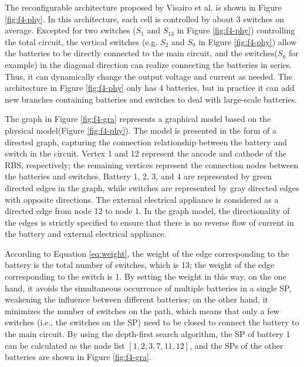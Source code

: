 \documentclass{article}
\begin{document}
The reconfigurable architecture proposed by Visairo et al.\cite{visairoReconfigurableBatteryPack2008} is shown in Figure \ref{fig:f4-phy}.
In this architecture, each cell is controlled by about 3 switches on average.
Excepted for two switches ($S_1$ and $S_{13}$ in Figure \ref{fig:f4-phy}) controlling the total circuit, the vertical switches (e.g. $S_2$ and $S_9$ in Figure \ref{fig:f4-phy}) allow the batteries to be directly connected to the main circuit, and the switches($S_6$ for example) in the diagonal direction can realize connecting the batteries in series.
Thus, it can dynamically change the output voltage and current as needed.
The architecture in Figure \ref{fig:f4-phy} only has 4 batteries, but in practice it can add new branches containing batteries and switches to deal with large-scale batteries\cite{kimDependableEfficientScalable2010}.


The graph in Figure \ref{fig:f4-gra} represents a graphical model based on the physical model(Figure \ref{fig:f4-phy}).
The model is presented in the form of a directed graph, capturing the connection relationship between the battery and switch in the circuit.
Vertex 1 and 12 represent the ancode and cathode of the RBS, respectively;
the remaining vertices represent the connection nodes between the batteries and switches.
Battery 1, 2, 3, and 4 are represented by green directed edges in the graph, while switches are represented by gray directed edges with opposite directions.
The external electrical appliance is considered as a directed edge from node 12 to node 1.
In the graph model, the directionality of the edges is strictly specified to ensure that there is no reverse flow of current in the battery and external electrical appliance.


According to Equation \ref{eq:weight}, the weight of the edge corresponding to the battery is the total number of switches, which is 13;
the weight of the edge corresponding to the switch is 1.
By setting the weight in this way, on the one hand, it avoids the simultaneous occurrence of multiple batteries in a single SP, weakening the influence between different batteries;
on the other hand, it minimizes the number of switches on the path, which means that only a few switches (i.e., the switches on the SP) need to be closed to connect the battery to the main circuit.
By using the depth-first search algorithm, the SP of battery 1 can be calculated as the node list $[1, 2, 3, 7, 11, 12]$, and the SPs of the other batteries are shown in Figure \ref{fig:f4-gra}.
\end{document}
